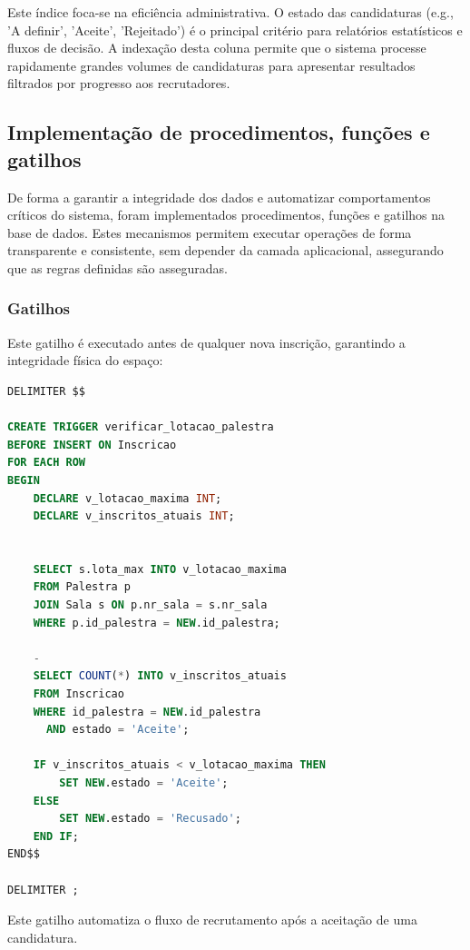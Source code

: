 \documentclass[12pt,a4paper]{article}
\begin{document}
Este índice foca-se na eficiência administrativa. O estado das candidaturas (e.g., 'A definir', 'Aceite', 'Rejeitado') é o principal critério para relatórios estatísticos e fluxos de decisão. A indexação desta coluna permite que o sistema processe rapidamente grandes volumes de candidaturas para apresentar resultados filtrados por progresso aos recrutadores.


\subsection{Implementação de procedimentos, funções e gatilhos}


De forma a garantir a integridade dos dados e automatizar comportamentos 
críticos do sistema, foram implementados procedimentos, funções e gatilhos na 
base de dados. Estes mecanismos permitem executar operações de 
forma transparente e consistente, sem depender da camada aplicacional, 
assegurando que as regras definidas são asseguradas.

\newpage

\subsubsection*{Gatilhos}

Este gatilho é executado antes de qualquer nova inscrição, garantindo a
integridade física do espaço:


\begin{lstlisting}[language=SQL,caption={Criação do gatilho que verifica a lotação}, label={lst:roles}]
DELIMITER $$

CREATE TRIGGER verificar_lotacao_palestra
BEFORE INSERT ON Inscricao
FOR EACH ROW
BEGIN
    DECLARE v_lotacao_maxima INT;
    DECLARE v_inscritos_atuais INT;

   
    SELECT s.lota_max INTO v_lotacao_maxima
    FROM Palestra p
    JOIN Sala s ON p.nr_sala = s.nr_sala
    WHERE p.id_palestra = NEW.id_palestra;

    -
    SELECT COUNT(*) INTO v_inscritos_atuais
    FROM Inscricao
    WHERE id_palestra = NEW.id_palestra 
      AND estado = 'Aceite';

    IF v_inscritos_atuais < v_lotacao_maxima THEN
        SET NEW.estado = 'Aceite';
    ELSE
        SET NEW.estado = 'Recusado'; 
    END IF;
END$$

DELIMITER ;
\end{lstlisting}
\newpage
Este gatilho automatiza o fluxo de recrutamento após a aceitação de uma
candidatura.
\end{document}
